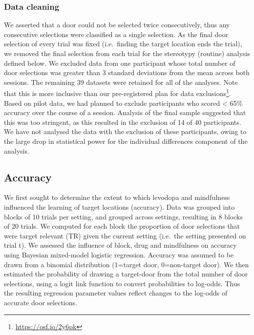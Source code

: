 \documentclass[
  man]{apa6}
\begin{document}
\hypertarget{data-cleaning}{%
\subsubsection{Data cleaning}\label{data-cleaning}}

\label{sec:Data cleaning}

We asserted that a door could not be selected twice consecutively, thus any consecutive selections were classified as a single selection. As the final door selection of every trial was fixed (i.e.~finding the target location ends the trial), we removed the final selection from each trial for the stereotypy (routine) analysis defined below. We excluded data from one participant whose total number of door selections was greater than 3 standard deviations from the mean across both sessions. The remaining 39 datasets were retained for all of the analyses. Note that this is more inclusive than our pre-registered plan for data exclusions\footnote{\url{https://osf.io/2y6pk}}. Based on pilot data, we had planned to exclude participants who scored \textless{} 65\% accuracy over the course of a session. Analysis of the final sample suggested that this was too stringent, as this resulted in the exclusion of 14 of 40 participants. We have not analysed the data with the exclusion of these participants, owing to the large drop in statistical power for the individual differences component of the analysis.

\hypertarget{accuracy}{%
\subsection{Accuracy}\label{accuracy}}

\label{sec:Accuracy}

We first sought to determine the extent to which levodopa and mindfulness influenced the learning of target locations (accuracy). Data was grouped into blocks of 10 trials per setting, and grouped across settings, resulting in 8 blocks of 20 trials. We computed for each block the proportion of door selections that were target relevant (TR) given the current setting (i.e.~the setting presented on trial t). We assessed the influence of block, drug and mindfulness on accuracy using Bayesian mixed-model logistic regression. Accuracy was assumed to be drawn from a binomial distribution (1=target door, 0=non-target door). We then estimated the probability of drawing a target-door from the total number of door selections, using a logit link function to convert probabilities to log-odds. Thus the resulting regression parameter values reflect changes to the log-odds of accurate door selections.
\end{document}
